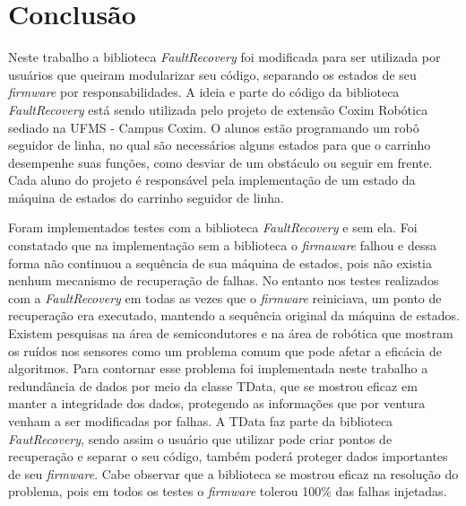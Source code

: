 
\chapter{Conclusão} \label{cap:conclusao}

Neste trabalho a biblioteca \textit{FaultRecovery} foi modificada para ser utilizada por usuários que queiram modularizar seu código, separando os estados de seu \textit{firmware} por responsabilidades. A ideia e parte do código da biblioteca \textit{FaultRecovery} está sendo utilizada pelo projeto de extensão Coxim Robótica sediado na UFMS - Campus Coxim. O alunos estão programando um robô seguidor de linha, no qual são necessários alguns estados para que o carrinho desempenhe suas funções, como desviar de um obstáculo ou seguir em frente. Cada aluno do projeto é responsável pela implementação de um estado da máquina de estados do carrinho seguidor de linha.  

Foram implementados testes com a biblioteca \textit{FaultRecovery} e sem ela. Foi constatado que na implementação sem a biblioteca o \textit{firmaware} falhou e dessa forma não continuou a sequência de sua máquina de estados, pois não existia nenhum mecanismo de recuperação de falhas. No entanto nos testes realizados com a \textit{FaultRecovery} em todas as vezes que o \textit{firmware} reiniciava, um ponto de recuperação era executado, mantendo a sequência original da máquina de estados. Existem pesquisas na área de semicondutores e na área de robótica que mostram os ruídos nos sensores como um problema comum que pode afetar a eficácia de algoritmos. Para contornar esse problema foi implementada neste trabalho a redundância de dados por meio da classe TData, que se mostrou eficaz em manter a integridade dos dados, protegendo as informações que por ventura venham a ser modificadas por falhas. A TData faz parte da biblioteca \textit{FautRecovery}, sendo assim o usuário que utilizar pode criar pontos de recuperação e separar o seu código, também poderá proteger dados importantes de seu \textit{firmware}. Cabe observar que a biblioteca se mostrou eficaz na resolução do problema, pois em todos os testes o \textit{firmware} tolerou 100\% das falhas injetadas. %

